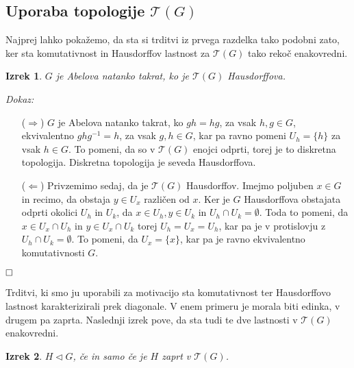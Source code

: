 \documentclass[a4paper,12pt]{article}
\def\qed{$\hfill\Box$}   %
\newtheorem{izrek}{Izrek}
\begin{document}
\subsection{Uporaba topologije $\mathcal{T}(G)$}

Najprej lahko pokažemo, da sta si trditvi iz prvega razdelka tako podobni zato, ker sta komutativnost in Hausdorffov lastnost za $\mathcal{T}(G)$ tako rekoč enakovredni.

\begin{izrek}
    $G$ je Abelova natanko takrat, ko je $\mathcal{T}(G)$ Hausdorffova.
\end{izrek}

\noindent
{\em Dokaz:\/}
    \begin{itemize}
        \item[($\Rightarrow$)] $G$ je Abelova natanko takrat, ko $gh = hg $, za vsak $h,g \in G$, ekvivalentno $ghg^{-1} = h$, za vsak $g,h \in G$, kar pa ravno pomeni $U_h = \{ h\}$ za vsak $h \in G$.
        To pomeni, da so v $\mathcal{T}(G)$ enojci odprti, torej je to diskretna topologija. Diskretna topologija je seveda Hausdorffova.
        \item[($\Leftarrow$)] Privzemimo sedaj, da je $\mathcal{T}(G)$ Hausdorffov. Imejmo poljuben $x \in G$ in recimo, da obstaja $y \in U_x$ različen od $x$.
        Ker je $G$ Hausdorffova obstajata odprti okolici $U_h$ in $U_k$, da $x \in U_h, y \in U_k$ in $U_h \cap U_k = \emptyset$.
        Toda to pomeni, da $x \in U_x \cap U_h$ in $y \in U_x \cap U_k$ torej $U_h = U_x = U_h$, kar pa je v protislovju z $U_h \cap U_k = \emptyset$.
        To pomeni, da $U_x = \{x\}$, kar pa je ravno ekvivalentno komutativnosti $G$.
    \end{itemize} 
\qed

Trditvi, ki smo ju uporabili za motivacijo sta komutativnost ter Hausdorffovo lastnost karakterizirali prek diagonale.
V enem primeru je morala biti edinka, v drugem pa zaprta. Naslednji izrek pove, da sta tudi te dve lastnosti v $\mathcal{T}(G)$ enakovredni.

\begin{izrek}
    $H \triangleleft G$, če in samo če je $H$ zaprt v $\mathcal{T}(G)$.
\end{izrek}
\end{document}

